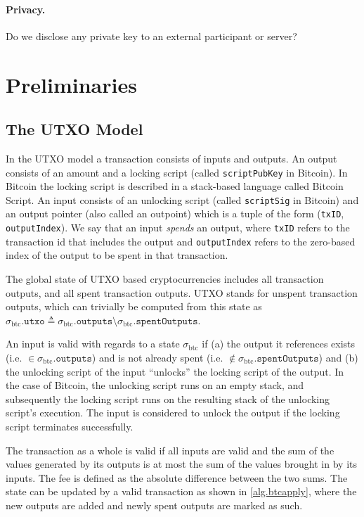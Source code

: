 \documentclass[sigconf,authordraft]{acmart}
\begin{document}
\paragraph{Privacy.} Do we disclose any private key to an external participant or server?

\section{Preliminaries}
\subsection{The UTXO Model}
In the UTXO model a transaction consists of inputs and outputs. An output consists of an amount and a locking script (called \texttt{scriptPubKey} in Bitcoin). In Bitcoin the locking script is described in a stack-based language called Bitcoin Script. An input consists of an unlocking script (called \texttt{scriptSig} in Bitcoin) and an output pointer (also called an outpoint) which is a tuple of the form (\texttt{txID}, \texttt{outputIndex}). We say that an input \emph{spends} an output, where \texttt{txID} refers to the transaction id that includes the output and \texttt{outputIndex} refers to the zero-based index of the output to be spent in that transaction.

\def\btcstate{\sigma_\text{btc}}
\def\btcapply{\text{apply}\textsubscript{btc}}
\def\outputs{\texttt{outputs}}
\def\inputs{\texttt{inputs}}
\def\spentOutputs{\texttt{spentOutputs}}
\def\utxo{\texttt{utxo}}
The global state of UTXO based cryptocurrencies includes all transaction outputs, and all spent transaction outputs. UTXO stands for unspent transaction outputs, which can trivially be computed from this state as $\btcstate.\utxo \triangleq \btcstate.\outputs \setminus \btcstate.\spentOutputs$.

An input is valid with regards to a state $\btcstate$ if (a) the output it references exists (i.e. $\in \btcstate.\outputs$) and is not already spent (i.e. $\notin \btcstate.\spentOutputs$) and (b) the unlocking script of the input ``unlocks'' the locking script of the output. In the case of Bitcoin, the unlocking script runs on an empty stack, and subsequently the locking script runs on the resulting stack of the unlocking script's execution. The input is considered to unlock the output if the locking script terminates successfully.

The transaction as a whole is valid if all inputs are valid and the sum of the values generated by its outputs is at most the sum of the values brought in by its inputs. The fee is defined as the absolute difference between the two sums. The state can be updated by a valid transaction as shown in \cref{alg.btcapply}, where the new outputs are added and newly spent outputs are marked as such.
\end{document}
